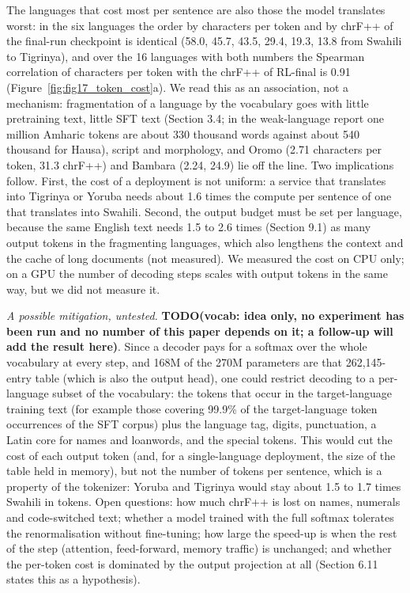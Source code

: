 The languages that cost most per sentence are also those the model translates worst: in the six languages the order by characters per token and by chrF++ of the final-run checkpoint is identical (58.0, 45.7, 43.5, 29.4, 19.3, 13.8 from Swahili to Tigrinya), and over the 16 languages with both numbers the Spearman correlation of characters per token with the chrF++ of RL-final is 0.91 (Figure~\ref{fig:fig17_token_cost}a). We read this as an association, not a mechanism: fragmentation of a language by the vocabulary goes with little pretraining text, little SFT text (Section 3.4; in the weak-language report one million Amharic tokens are about 330 thousand words against about 540 thousand for Hausa), script and morphology, and Oromo (2.71 characters per token, 31.3 chrF++) and Bambara (2.24, 24.9) lie off the line. Two implications follow. First, the cost of a deployment is not uniform: a service that translates into Tigrinya or Yoruba needs about 1.6 times the compute per sentence of one that translates into Swahili. Second, the output budget must be set per language, because the same English text needs 1.5 to 2.6 times (Section 9.1) as many output tokens in the fragmenting languages, which also lengthens the context and the cache of long documents (not measured). We measured the cost on CPU only; on a GPU the number of decoding steps scales with output tokens in the same way, but we did not measure it.

\emph{A possible mitigation, untested.} {\color{red}\textbf{TODO(vocab: idea only, no experiment has been run and no number of this paper depends on it; a follow-up will add the result here)}}. Since a decoder pays for a softmax over the whole vocabulary at every step, and 168M of the 270M parameters are that 262,145-entry table (which is also the output head), one could restrict decoding to a per-language subset of the vocabulary: the tokens that occur in the target-language training text (for example those covering 99.9\% of the target-language token occurrences of the SFT corpus) plus the language tag, digits, punctuation, a Latin core for names and loanwords, and the special tokens. This would cut the cost of each output token (and, for a single-language deployment, the size of the table held in memory), but not the number of tokens per sentence, which is a property of the tokenizer: Yoruba and Tigrinya would stay about 1.5 to 1.7 times Swahili in tokens. Open questions: how much chrF++ is lost on names, numerals and code-switched text; whether a model trained with the full softmax tolerates the renormalisation without fine-tuning; how large the speed-up is when the rest of the step (attention, feed-forward, memory traffic) is unchanged; and whether the per-token cost is dominated by the output projection at all (Section 6.11 states this as a hypothesis).

